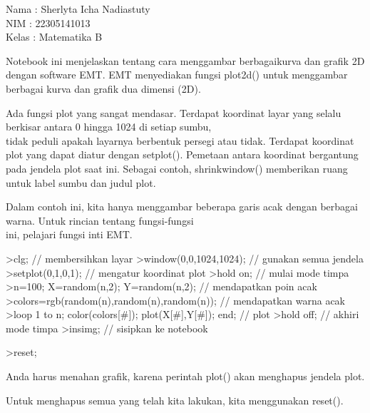 \documentclass{article}
\begin{document}
\begin{eulernotebook}
\begin{eulercomment}
Nama : Sherlyta Icha Nadiastuty\\
NIM : 22305141013\\
Kelas : Matematika B

\begin{eulercomment}
\begin{eulercomment}
Notebook ini menjelaskan tentang cara menggambar berbagaikurva dan
grafik 2D dengan software EMT. EMT menyediakan fungsi plot2d() untuk
menggambar berbagai kurva dan grafik dua dimensi (2D).

\end{eulercomment}
\begin{eulercomment}
Ada fungsi plot yang sangat mendasar. Terdapat koordinat layar yang
selalu berkisar antara 0 hingga 1024 di setiap sumbu,\\
tidak peduli apakah layarnya berbentuk persegi atau tidak. Terdapat
koordinat plot yang dapat diatur dengan setplot(). Pemetaan antara
koordinat bergantung pada jendela plot saat ini. Sebagai contoh,
shrinkwindow() memberikan ruang untuk label sumbu dan judul plot.

Dalam contoh ini, kita hanya menggambar beberapa garis acak dengan
berbagai warna. Untuk rincian tentang fungsi-fungsi\\
ini, pelajari fungsi inti EMT.
\end{eulercomment}
\begin{eulerprompt}
>clg; // membersihkan layar
>window(0,0,1024,1024); // gunakan semua jendela
>setplot(0,1,0,1); // mengatur koordinat plot
>hold on; // mulai mode timpa
>n=100; X=random(n,2); Y=random(n,2);  // mendapatkan poin acak
>colors=rgb(random(n),random(n),random(n)); // mendapatkan warna acak
>loop 1 to n; color(colors[#]); plot(X[#],Y[#]); end; // plot
>hold off; // akhiri mode timpa
>insimg; // sisipkan ke notebook
\end{eulerprompt}
\begin{eulerprompt}
>reset;
\end{eulerprompt}
\begin{eulercomment}
Anda harus menahan grafik, karena perintah plot() akan menghapus
jendela plot. 

Untuk menghapus semua yang telah kita lakukan, kita menggunakan
reset().


\end{eulercomment}
\end{eulercomment}
\end{eulercomment}
\end{eulernotebook}
\end{document}
